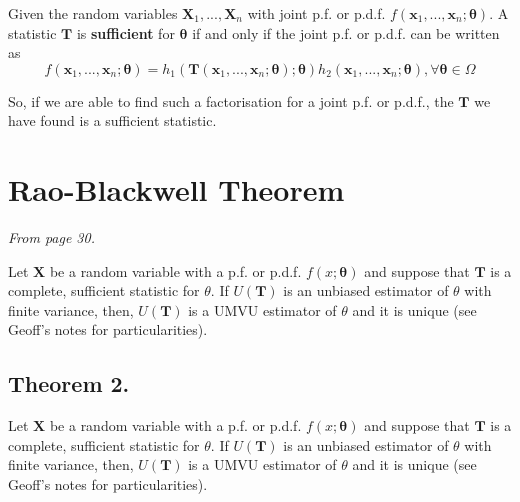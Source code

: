 \begin{theorem}\label{thm: Factorisation Theorem}
    Given the random variables \(\bm{X}_1,...,\bm{X}_n\) with joint p.f. or p.d.f. \(f(\bm{x}_1,...,\bm{x}_n;\bm{\theta})\). 
    A statistic \(\bm{T}\) is \textbf{sufficient} for \(\bm{\theta}\) if and only if the joint p.f. or p.d.f. can be written as 
    \[f(\bm{x}_1,...,\bm{x}_n;\bm{\theta}) = h_1(\bm{T}(\bm{x}_1,...,\bm{x}_n;\bm{\theta});\bm{\theta})
    h_2(\bm{x}_1,...,\bm{x}_n;\bm{\theta}), \forall\bm{\theta}\in\Omega\]
\end{theorem}



So, if we are able to find such a factorisation for a joint p.f. or p.d.f., 
the \(\bm{T}\) we have found is a sufficient statistic. 


\section{Rao-Blackwell Theorem}\label{sec:Rao-Blackwell}

\textit{From page 30.}

\begin{theorem}\label{thm:Rao-Blackwell}
    Let \(\bm{X}\) be a random variable with a p.f. or p.d.f. \(f(x;\bm{\theta})\) and suppose that \(\bm{T}\) is a complete, sufficient statistic for \(\theta\). 
    If \(U(\bm{T})\) is an unbiased estimator of \(\theta\) with finite variance, 
    then, \(U(\bm{T})\) is a UMVU estimator of \(\theta\) and it is unique (see Geoff's notes for particularities).
\end{theorem}

\subsection{Theorem 2.}\label{sec:thm 2 UMVU}

\begin{theorem}[Theorem 2]\label{thm:thm 2 UMVU}
    Let \(\bm{X}\) be a random variable with a p.f. or p.d.f. \(f(x;\bm{\theta})\) and suppose that \(\bm{T}\) is a complete, sufficient statistic for \(\theta\). 
    If \(U(\bm{T})\) is an unbiased estimator of \(\theta\) with finite variance, 
    then, \(U(\bm{T})\) is a UMVU estimator of \(\theta\) and it is unique (see Geoff's notes for particularities).
\end{theorem}